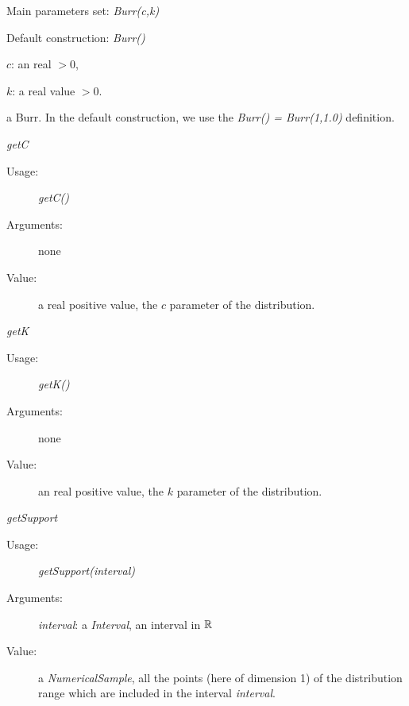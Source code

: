 \begin{description}

\item[Usage:]\rule{0pt}{1em}
\begin{description}
\item Main parameters set: \textit{Burr(c,k)}
\item  Default construction: \textit{Burr()}
\end{description}

\item[Arguments:]  \rule{0pt}{1em}
\begin{description}
\item $c$: an real $>0$,
\item  $k$: a real value $>0$.
\end{description}

\item[Value:] a Burr. In the default construction, we use the \textit{Burr() = Burr(1,1.0)} definition.

\item[Some methods:] \rule{0pt}{1em}
\begin{description}

\item \textit{getC}
\begin{description}
\item[Usage:] \textit{getC()}
\item[Arguments:] none
\item[Value:]  a real positive value, the $c$ parameter of the  distribution.
\end{description}
\bigskip

\item \textit{getK}
\begin{description}
\item[Usage:] \textit{getK()}
\item[Arguments:] none
\item[Value:]  an real positive value, the $k$ parameter of the  distribution.
\end{description}
\bigskip

\item \textit{getSupport}
\begin{description}
\item[Usage:] \textit{getSupport(interval)}
\item[Arguments:] \textit{interval}: a \textit{Interval}, an interval in ${\mathbb R}$
\item[Value:]  a \textit{NumericalSample}, all the points (here of dimension 1) of the distribution range which are included in the interval \textit{interval}.
\end{description}


\end{description}
\end{description}
